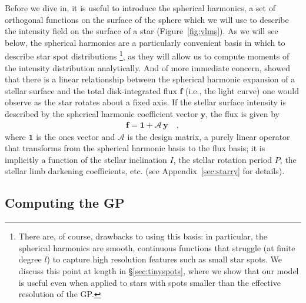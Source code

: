 \documentclass[modern]{aastex62}
\begin{document}
Before we dive in, it is useful to introduce the spherical harmonics,
a set of orthogonal functions on the surface of the sphere which we will use
to describe the intensity field on the surface of a star
(Figure~\ref{fig:ylms}). As we will see below,
the spherical harmonics are a particularly convenient basis in which to
describe star spot distributions%
\footnote{There are, of course, drawbacks to using this basis:
    in particular, the spherical harmonics are smooth, continuous functions that
    struggle (at finite degree $l$) to capture high resolution features such as
    small star spots. We discuss this point at length in \S\ref{sec:tinyspots},
    where we show that our model is useful even when applied to stars with spots
    smaller than the effective resolution of the GP.}, as they will allow us to compute
moments of the intensity distribution analytically. And of more immediate concern,
\citet{Luger2019} showed that there is a linear relationship between the
spherical harmonic expansion of a stellar surface and the total disk-integrated
flux $\mathbf{f}$ (i.e., the light curve)
one would observe as the star rotates about a fixed axis.
If the stellar surface intensity is described by the spherical harmonic
coefficient vector $\mathbf{y}$, the flux is given by
%
\begin{align}
    \label{eq:fAy}
    \mathbf{f} = \mathbf{1} + \pmb{\mathcal{A}} \, \mathbf{y}
    \quad,
\end{align}
%
where $\mathbf{1}$ is the ones vector and
$\pmb{\mathcal{A}}$ is the \starry
design matrix, a purely linear operator that transforms from the spherical
harmonic basis to the flux basis; it is implicitly
a function of the stellar inclination $I$, the stellar
rotation period $P$, the stellar limb darkening coefficients, etc.
(see Appendix~\ref{sec:starry} for details).

\subsection{Computing the GP}
\label{sec:gp}
%
\end{document}
